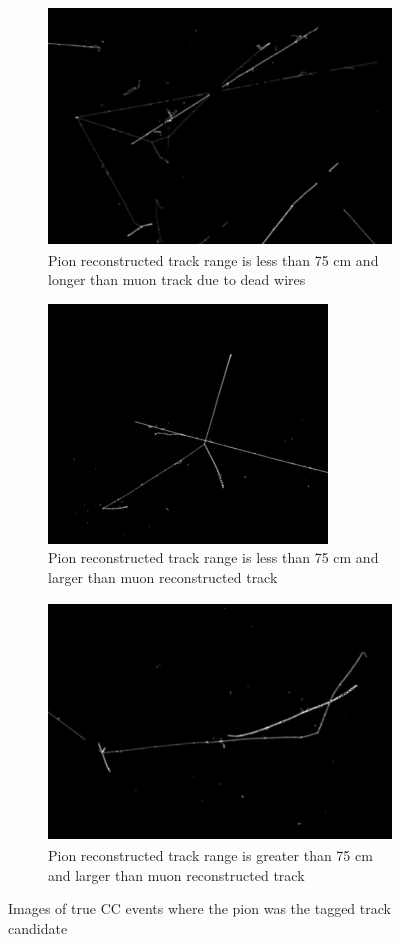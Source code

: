 \begin{figure}[htp!]
\centering
	\begin{subfigure}[b]{.3\textwidth}
	\includegraphics[width=\textwidth,height=2.5in]{figs/interesting_event.png}
	\caption{Pion reconstructed track range is less than 75 cm and longer than muon track due to dead wires}
	\label{fig:longer_muon_badreco}
	\end{subfigure}
	\quad
	\begin{subfigure}[b]{.3\textwidth}
	\includegraphics[width=\textwidth,height=2.5in]{figs/event2.png}
	\caption{Pion reconstructed track range is less than 75 cm and larger than muon reconstructed track}
	\label{fig:longer_pion}
	\end{subfigure}
	\quad
	\begin{subfigure}[b]{.3\textwidth}
	\includegraphics[width=\textwidth,height=2.5in]{figs/mupievent.png}
	\caption{Pion reconstructed track range is greater than 75 cm and larger than muon reconstructed track}
	\label{fig:verylongpion}
	\end{subfigure}
	\quad
\caption{Images of true CC events where the pion was the tagged track candidate}
\label{fig:evd}
\end{figure}


